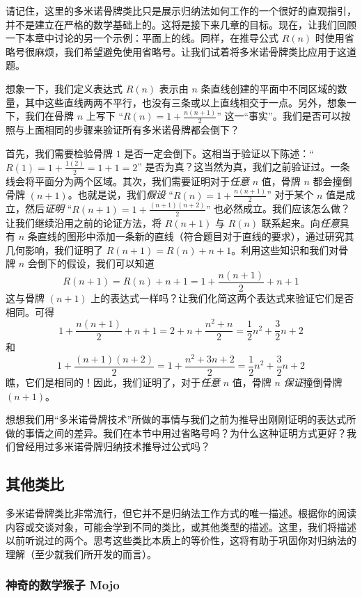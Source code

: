 请记住，这里的多米诺骨牌类比只是展示归纳法如何工作的一个很好的直观指引，并不是建立在严格的数学基础上的。这将是接下来几章的目标。现在，让我们回顾一下本章中讨论的另一个示例：平面上的线。同样，在推导公式 $R(n)$ 时使用省略号很麻烦，我们希望避免使用省略号。让我们试着将多米诺骨牌类比应用于这道题。

想象一下，我们定义表达式 $R(n)$ 表示由 $n$ 条直线创建的平面中不同区域的数量，其中这些直线两两不平行，也没有三条或以上直线相交于一点。另外，想象一下，我们在骨牌 $n$ 上写下 “$R(n) = 1 + \frac{n(n+1)}{2}$” 这一“事实”。我们是否可以按照与上面相同的步骤来验证所有多米诺骨牌都会倒下？

首先，我们需要检验骨牌 $1$ 是否一定会倒下。这相当于验证以下陈述：“$R(1) = 1+\frac{1(2)}{2} = 1+1 = 2$” 是否为真？这当然为真，我们之前验证过。一条线会将平面分为两个区域。其次，我们需要证明对于\textit{任意} $n$ 值，骨牌 $n$ 都会撞倒骨牌 $(n + 1)$。也就是说，我们\textit{假设} “$R(n) = 1 + \frac{n(n+1)}{2}$” 对于某个 $n$ 值是成立，然后\textit{证明} “$R(n + 1) = 1 + \frac{(n+1)(n +2)}{2}”$ 也必然成立。我们应该怎么做？让我们继续沿用之前的论证方法，将 $R(n + 1)$ 与 $R(n)$ 联系起来。向\textit{任意}具有 $n$ 条直线的图形中添加一条新的直线（符合题目对于直线的要求），通过研究其几何影响，我们证明了 $R(n+ 1) = R(n) +n+ 1$。利用这些知识和我们对骨牌 $n$ 会倒下的假设，我们可以知道
\[R(n + 1) = R(n) + n + 1 = 1 +\frac{n(n+1)}{2}+ n + 1\]
这与骨牌 $(n + 1)$ 上的表达式一样吗？让我们化简这两个表达式来验证它们是否相同。可得
\[1 +\frac{n(n+1)}{2}+ n + 1=2+n+\frac{n^2+n}{2} = \frac{1}{2}n^2+\frac{3}{2}n+2\]
和
\[1 + \frac{(n+1)(n +2)}{2} = 1+\frac{n^2+3n+2}{2} =  \frac{1}{2}n^2+\frac{3}{2}n+2\]
瞧，它们是相同的！因此，我们证明了，对于\textit{任意} $n$ 值，骨牌 $n$ \textit{保证}撞倒骨牌 $(n+1)$。

想想我们用“多米诺骨牌技术”所做的事情与我们之前为推导出刚刚证明的表达式所做的事情之间的差异。我们在本节中用过省略号吗？为什么这种证明方式更好？我们曾经用过多米诺骨牌归纳技术推导过公式吗？

\subsection{其他类比}

多米诺骨牌类比非常流行，但它并不是归纳法工作方式的唯一描述。根据你的阅读内容或交谈对象，可能会学到不同的类比，或其他类型的描述。这里，我们将描述以前听说过的两个。思考这些类比本质上的等价性，这将有助于巩固你对归纳法的理解（至少就我们所开发的而言）。

\subsubsection*{神奇的数学猴子 Mojo}

